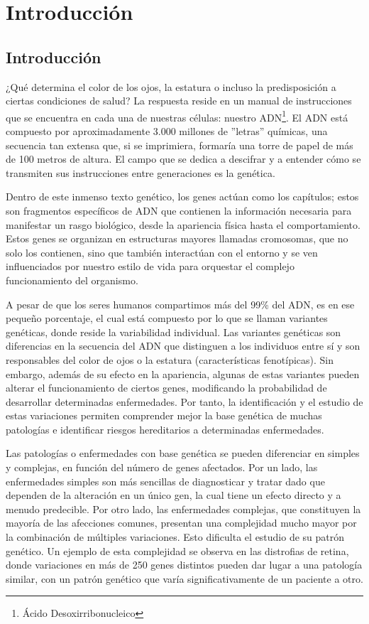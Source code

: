 \chapter{Introducción}
\label{chap:introducción}

\section{Introducción}
¿Qué determina el color de los ojos, la estatura o incluso la predisposición a ciertas condiciones de salud? La respuesta reside en un manual de instrucciones que se encuentra en cada una de nuestras células: nuestro ADN\footnote{Ácido Desoxirribonucleico}. El ADN está compuesto por aproximadamente 3.000 millones de ''letras'' químicas, una secuencia tan extensa que, si se imprimiera, formaría una torre de papel de más de 100 metros de altura\cite{lander2001}. El campo que se dedica a descifrar y a entender cómo se transmiten sus instrucciones entre generaciones es la genética.

Dentro de este inmenso texto genético, los genes actúan como los capítulos; estos son fragmentos específicos de ADN que contienen la información necesaria para manifestar un rasgo biológico, desde la apariencia física hasta el comportamiento. Estos genes se organizan en estructuras mayores llamadas cromosomas, que no solo los contienen, sino que también interactúan con el entorno y se ven influenciados por nuestro estilo de vida para orquestar el complejo funcionamiento del organismo\cite{robinson}. 

A pesar de que los seres humanos compartimos más del 99\% del ADN, es en ese pequeño porcentaje, el cual está compuesto por lo que se llaman variantes genéticas, donde reside la variabilidad individual. Las variantes genéticas son diferencias en la secuencia del ADN que distinguen a los individuos entre sí y son responsables del color de ojos o la estatura (características fenotípicas). Sin embargo, además de su efecto en la apariencia, algunas de estas variantes pueden alterar el funcionamiento de ciertos genes, modificando la probabilidad de desarrollar determinadas enfermedades. Por tanto, la identificación y el estudio de estas variaciones permiten comprender mejor la base genética de muchas patologías e identificar riesgos hereditarios a determinadas enfermedades.  

Las patologías o enfermedades con base genética se pueden diferenciar en simples y complejas, en función del número de genes afectados. Por un lado, las enfermedades simples son más sencillas de diagnosticar y tratar dado que dependen de la alteración en un único gen, la cual tiene un efecto directo y a menudo predecible. Por otro lado, las enfermedades complejas, que constituyen la mayoría de las afecciones comunes, presentan una complejidad mucho mayor por la combinación de múltiples variaciones\cite{visscher}. Esto dificulta el estudio de su patrón genético. Un ejemplo de esta complejidad se observa en las distrofias de retina, donde variaciones en más de 250 genes distintos pueden dar lugar a una patología similar, con un patrón genético que varía significativamente de un paciente a otro.  

